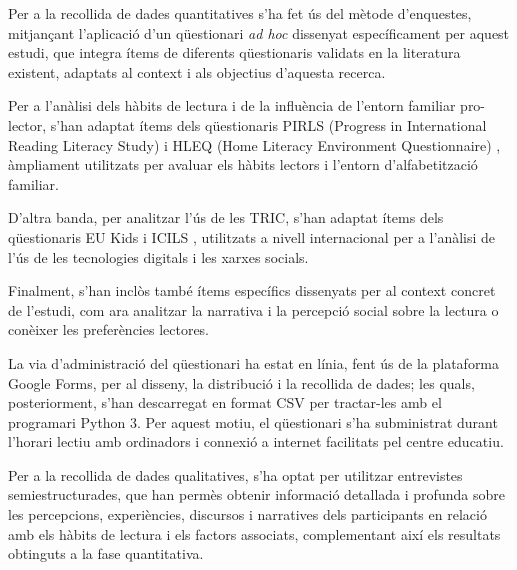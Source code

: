 \documentclass[12pt]{article}
\begin{document}
Per a la recollida de dades quantitatives s'ha fet ús del mètode d'enquestes, mitjançant l'aplicació d'un qüestionari \emph{ad hoc} dissenyat específicament per aquest estudi, que integra ítems de diferents qüestionaris validats en la literatura existent, adaptats al context i als objectius d'aquesta recerca.

Per a l’anàlisi dels hàbits de lectura i de la influència de l’entorn familiar pro-lector, s’han adaptat ítems dels qüestionaris PIRLS (Progress in International Reading Literacy Study) \parencite{pirls} i HLEQ (Home Literacy Environment Questionnaire) \parencite{hleq}, àmpliament utilitzats per avaluar els hàbits lectors i l’entorn d’alfabetització familiar.

D'altra banda, per analitzar l'ús de les TRIC, s’han adaptat ítems dels qüestionaris EU Kids \parencite{eukids} i ICILS \parencite{icils}, utilitzats a nivell internacional per a l’anàlisi de l’ús de les tecnologies digitals i les xarxes socials.

Finalment, s’han inclòs també ítems específics dissenyats per al context concret de l’estudi, com ara analitzar la narrativa i la percepció social sobre la lectura o conèixer les preferències lectores.


La via d’administració del qüestionari ha estat en línia, fent ús de la plataforma Google Forms, per al disseny, la distribució i la recollida de dades; les quals, posteriorment, s'han descarregat en format CSV per tractar-les amb el programari Python 3. Per aquest motiu, el qüestionari s'ha subministrat durant l’horari lectiu amb ordinadors i connexió a internet facilitats pel centre educatiu.

Per a la recollida de dades qualitatives, s'ha optat per utilitzar entrevistes semiestructurades, que han permès obtenir informació detallada i profunda sobre les percepcions, experiències, discursos i narratives dels participants en relació amb els hàbits de lectura i els factors associats, complementant així els resultats obtinguts a la fase quantitativa.

\end{document}
